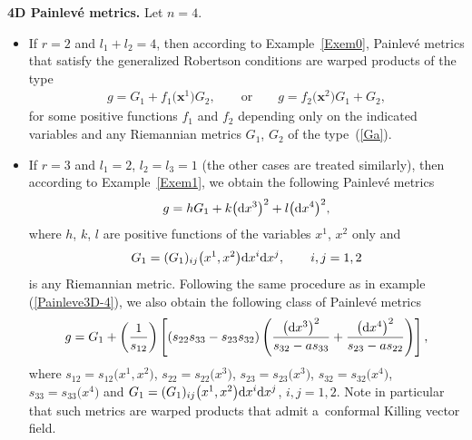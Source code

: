 \documentclass[pdftex]{sigma}
\numberwithin{equation}{section}
\begin{document}
\textbf{4D Painlev\'e metrics.} Let $n=4$.
\begin{itemize}\itemsep=0pt
\item If $r=2$ and $l_1 + l_2 = 4$, then according to Example~\ref{Exem0}, Painlev\'e metrics that satisfy the generalized Robertson conditions are warped products of the type
\begin{gather*} %
 g = G_1 + f_1\big(\textbf{x}^1\big) G_{2}, \qquad \textrm{or} \qquad g = f_2\big(\textbf{x}^2\big) G_1 + G_{2},
\end{gather*}
for some positive functions $f_1$ and $f_{2}$ depending only on the indicated variables and any Riemannian metrics $G_1$, $G_2$ of the type~(\ref{Ga}).
\item If $r=3$ and $l_1 = 2$, $l_2 = l_3 = 1$ (the other cases are treated similarly), then according to Example~\ref{Exem1}, we obtain the following Painlev\'e metrics
\begin{gather*} %
 g = h G_1 + k \big({\rm d}x^3\big)^2 + l \big({\rm d}x^4\big)^2,
\end{gather*}
where $h$, $k$, $l$ are positive functions of the variables $x^1$, $x^2$ only and
\begin{gather*} G_1 = (G_1)_{ij}\big(x^1,x^2\big) {\rm d}x^i {\rm d}x^j, \qquad i,j=1,2\end{gather*} is any Riemannian metric. Following the same procedure as in example (\ref{Painleve3D-4}), we also obtain the following class of Painlev\'e metrics
\begin{gather*} %
 g = G_1 + \left( \frac{1}{s_{12}} \right) \left[ (s_{22}s_{33} - s_{23}s_{32}) \left( \frac{\big({\rm d}x^3\big)^2}{s_{32}-as_{33}} + \frac{\big({\rm d}x^4\big)^2}{s_{23}-as_{22}} \right) \right],
\end{gather*}
where $s_{12} = s_{12}\big(x^1,x^2\big)$, $s_{22} = s_{22}\big(x^3\big)$, $s_{23} = s_{23}\big(x^3\big)$, $s_{32} = s_{32}\big(x^4\big)$, $s_{33} = s_{33}\big(x^4\big)$ and $G_1 = (G_1)_{ij}\big(x^1,x^2\big) {\rm d}x^i {\rm d}x^j$, $i,j=1,2$. Note in particular that such metrics are warped products that admit a~conformal Killing vector field.


\end{itemize}
\end{document}

